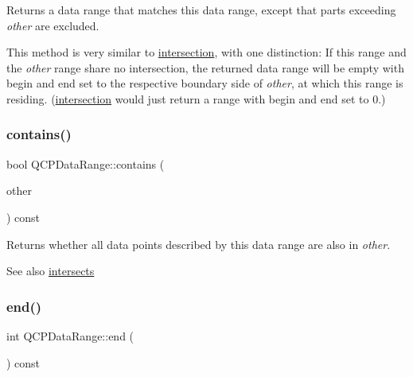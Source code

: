 Returns a data range that matches this data range, except that parts exceeding {\itshape other} are excluded.

This method is very similar to \mbox{\hyperlink{class_q_c_p_data_range_a84e1e03129dd52528efb4bac18d30183}{intersection}}, with one distinction\+: If this range and the {\itshape other} range share no intersection, the returned data range will be empty with begin and end set to the respective boundary side of {\itshape other}, at which this range is residing. (\mbox{\hyperlink{class_q_c_p_data_range_a84e1e03129dd52528efb4bac18d30183}{intersection}} would just return a range with begin and end set to 0.) \mbox{\label{class_q_c_p_data_range_a13ca398776374a3160aa85433718b812}} 
\subsubsection{\texorpdfstring{contains()}{contains()}}
{\footnotesize\ttfamily bool Q\+C\+P\+Data\+Range\+::contains (\begin{DoxyParamCaption}\item[{const \mbox{\hyperlink{class_q_c_p_data_range}{Q\+C\+P\+Data\+Range}} \&}]{other }\end{DoxyParamCaption}) const}

Returns whether all data points described by this data range are also in {\itshape other}.

\begin{DoxySeeAlso}{See also}
\mbox{\hyperlink{class_q_c_p_data_range_a8a1c437f9beffd55621f48f961d7f679}{intersects}} 
\end{DoxySeeAlso}
\mbox{\label{class_q_c_p_data_range_aee1b20fb045929c3753ee2ce14af7630}} 
\subsubsection{\texorpdfstring{end()}{end()}}
{\footnotesize\ttfamily int Q\+C\+P\+Data\+Range\+::end (\begin{DoxyParamCaption}{ }\end{DoxyParamCaption}) const\hspace{0.3cm}{\ttfamily [inline]}}

\mbox{\label{class_q_c_p_data_range_a36c8ad8acf177ffeb0a72c8d73030844}} 
